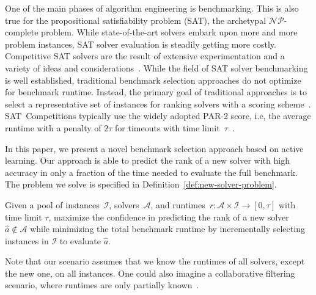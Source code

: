 \documentclass[runningheads]{llncs}
\begin{document}
One of the main phases of algorithm engineering is benchmarking.
This is also true for the pro\-po\-si\-tio\-nal sat\-is\-fia\-bi\-li\-ty problem (SAT), the archetypal $\mathcal{NP}$-complete problem.
While state-of-the-art solvers embark upon more and more problem instances, SAT solver evaluation is steadily getting more costly.
Competitive SAT solvers are the result of extensive experimentation and a variety of ideas and considerations~\cite{FroleyksHIJS21,sat2022}.
While the field of SAT solver benchmarking is well established, traditional benchmark selection approaches do not optimize for benchmark runtime.
Instead, the primary goal of traditional approaches is to select a representative set of instances for ranking solvers with a scoring scheme~\cite{Gelder11,HoosKSS13}.
SAT~Competitions typically use the widely adopted PAR-2 score, i.e, the average runtime with a penalty of $2 \tau$ for timeouts with time limit~$\tau$~\cite{FroleyksHIJS21}.

In this paper, we present a novel benchmark selection approach based on active learning.
Our approach is able to predict the rank of a new solver with high accuracy in only a fraction of the time needed to evaluate the full benchmark.
The problem we solve is specified in Definition~\ref{def:new-solver-problem}.

\begin{definition}
	Given a pool of instances~$\mathcal{I}$, solvers~$\mathcal{A}$, and runtimes~$r\!: \mathcal{A} \times \mathcal{I} \rightarrow \left[0, \tau\right]$ with time limit $\tau$, maximize the confidence in predicting the rank of a new solver $\hat{a} \notin \mathcal{A}$ while minimizing the total benchmark runtime by incrementally selecting instances in $\mathcal{I}$ to evaluate $\hat{a}$.
	\label{def:new-solver-problem}
\end{definition}

Note that our scenario assumes that we know the runtimes of all solvers, except the new one, on all instances.
One could also imagine a collaborative filtering scenario, where runtimes are only partially known~\cite{misir2017data,misir2017alors}.
\end{document}
